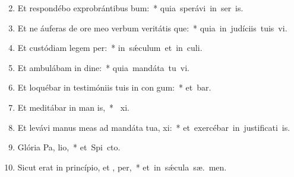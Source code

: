 \begin{flushleft}
\begin{enumerate}[leftmargin=*]
\setcounter{enumi}{1}

\item Et respondébo exprobrántibus  bum:~* \mbox{quia sperávi in ser is.}
\item Et ne áuferas de ore meo verbum veritátis que:~* \mbox{quia in judíciis tuis vi.}
\item Et custódiam legem  per:~* \mbox{in s\'{\ae}culum et in  culi.}
\item Et ambulábam in dine:~* \mbox{quia mandáta tu vi.}
\item Et loquébar in testimóniis tuis in con gum:~* \mbox{et  bar.}
\item Et meditábar in man is,~* \mbox{ xi.}
\item Et levávi manus meas ad mandáta tua,  xi:~* \mbox{et exercébar in justificati is.}
\item Glória Pa,  lio,~* \mbox{et Spi cto.}
\item Sicut erat in princípio, et ,  per,~* \mbox{et in s\'{\ae}cula sæ. men.}


\end{enumerate}
\end{flushleft}

